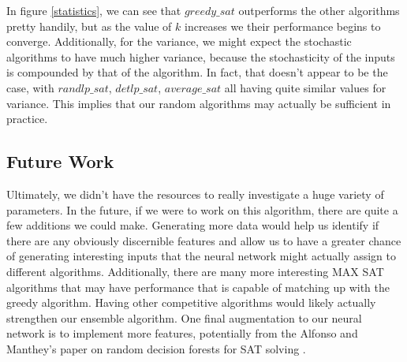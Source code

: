 \documentclass[paper=a4, fontsize=11pt]{scrartcl} %
\numberwithin{equation}{section} %
\numberwithin{figure}{section} %
\numberwithin{table}{section} %
\begin{document}
In figure \ref{statistics}, we can see that $greedy\_sat$ outperforms the other algorithms pretty handily, but as the value of $k$ increases we their performance begins to converge.  Additionally, for the variance, we might expect the stochastic algorithms to have much higher variance, because the stochasticity of the inputs is compounded by that of the algorithm.  In fact, that doesn't appear to be the case, with $randlp\_sat$, $detlp\_sat$, $average\_sat$ all having quite similar values for variance.  This implies that our random algorithms may actually be sufficient in practice.

\subsection{Future Work}

Ultimately, we didn't have the resources to really investigate a huge variety of parameters.  In the future, if we were to work on this algorithm, there are quite a few additions we could make.  Generating more data would help us identify if there are any obviously discernible features and allow us to have a greater chance of generating interesting inputs that the neural network might actually assign to different algorithms.   Additionally, there are many more interesting MAX SAT algorithms that may have performance that is capable of matching up with the greedy algorithm.  Having other competitive algorithms would likely actually strengthen our ensemble algorithm.  One final augmentation to our neural network is to implement more features, potentially from the Alfonso and Manthey's paper on random decision forests for SAT solving \cite{POS-14:New_CNF_Features_and_Formula_Classification}.


\nocite{*}
 

\end{document}

